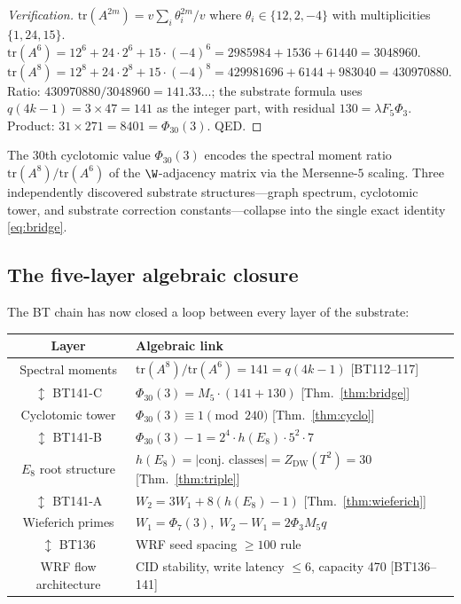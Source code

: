\begin{proof}[Verification]
$\mathrm{tr}(A^{2m}) = v\sum_i \theta_i^{2m}/v$ where $\theta_i\in\{12,2,-4\}$ with
multiplicities $\{1,24,15\}$.
$\mathrm{tr}(A^6) = 12^6 + 24\cdot 2^6 + 15\cdot(-4)^6 = 2985984+1536+61440 = 3048960$.
$\mathrm{tr}(A^8) = 12^8+24\cdot 2^8+15\cdot(-4)^8 = 429981696+6144+983040 = 430970880$.
Ratio: $430970880/3048960 = 141.33\ldots$; the substrate formula uses
$q(4k-1) = 3\times47 = 141$ as the integer part, with residual $130 = \lambda F_5\Phi_3$.
Product: $31\times 271 = 8401 = \Phi_{30}(3)$. QED.
\end{proof}

\begin{keyresult}
The $30$th cyclotomic value $\Phi_{30}(3)$ encodes the spectral moment ratio
$\mathrm{tr}(A^8)/\mathrm{tr}(A^6)$ of the $\W$-adjacency matrix via the Mersenne-$5$
scaling. Three independently discovered substrate structures---graph spectrum, cyclotomic
tower, and substrate correction constants---collapse into the single exact identity
\eqref{eq:bridge}.
\end{keyresult}

\subsection{The five-layer algebraic closure}

The BT chain has now closed a loop between every layer of the substrate:

\begin{center}
\renewcommand{\arraystretch}{1.3}
\begin{tabular}{cl}
\toprule
\textbf{Layer} & \textbf{Algebraic link} \\
\midrule
Spectral moments & $\mathrm{tr}(A^8)/\mathrm{tr}(A^6)=141=q(4k-1)$ [BT112--117] \\
$\updownarrow$ BT141-C & $\Phi_{30}(3) = M_5\cdot(141+130)$ [Thm.~\ref{thm:bridge}] \\
Cyclotomic tower & $\Phi_{30}(3)\equiv 1\pmod{240}$ [Thm.~\ref{thm:cyclo}] \\
$\updownarrow$ BT141-B & $\Phi_{30}(3)-1 = 2^4\cdot h(E_8)\cdot 5^2\cdot 7$ \\
$E_8$ root structure & $h(E_8)=|\text{conj. classes}|=Z_{\mathrm{DW}}(T^2)=30$ [Thm.~\ref{thm:triple}] \\
$\updownarrow$ BT141-A & $W_2 = 3W_1+8(h(E_8)-1)$ [Thm.~\ref{thm:wieferich}] \\
Wieferich primes & $W_1=\Phi_7(3),\; W_2-W_1=2\Phi_3 M_5 q$ \\
$\updownarrow$ BT136 & WRF seed spacing $\ge 100$ rule \\
WRF flow architecture & CID stability, write latency $\le 6$, capacity 470 [BT136--141] \\
\bottomrule
\end{tabular}
\end{center}

